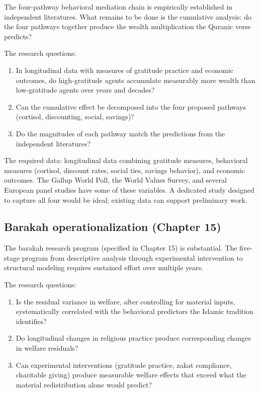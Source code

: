 The four-pathway behavioral mediation chain is empirically
established in independent literatures. What remains to be done
is the cumulative analysis: do the four pathways together produce
the wealth multiplication the Quranic verse predicts?

The research questions:

\begin{enumerate}[leftmargin=2em]
    \item In longitudinal data with measures of gratitude practice
    and economic outcomes, do high-gratitude agents accumulate
    measurably more wealth than low-gratitude agents over years
    and decades?
    \item Can the cumulative effect be decomposed into the four
    proposed pathways (cortisol, discounting, social, savings)?
    \item Do the magnitudes of each pathway match the predictions
    from the independent literatures?
\end{enumerate}

The required data: longitudinal data combining gratitude measures,
behavioral measures (cortisol, discount rates, social ties,
savings behavior), and economic outcomes. The Gallup World Poll,
the World Values Survey, and several European panel studies have
some of these variables. A dedicated study designed to capture all
four would be ideal; existing data can support preliminary work.

\subsection{Barakah operationalization (Chapter 15)}

The barakah research program (specified in Chapter 15) is
substantial. The five-stage program from descriptive analysis
through experimental intervention to structural modeling requires
sustained effort over multiple years.

The research questions:

\begin{enumerate}[leftmargin=2em]
    \item Is the residual variance in welfare, after controlling
    for material inputs, systematically correlated with the
    behavioral predictors the Islamic tradition identifies?
    \item Do longitudinal changes in religious practice produce
    corresponding changes in welfare residuals?
    \item Can experimental interventions (gratitude practice,
    zakat compliance, charitable giving) produce measurable
    welfare effects that exceed what the material redistribution
    alone would predict?
\end{enumerate}

